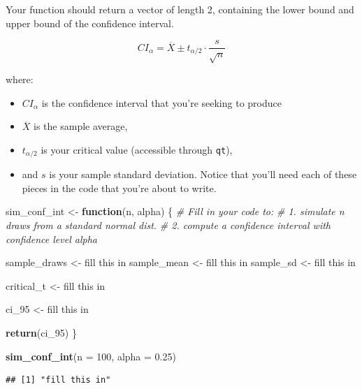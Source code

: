 \documentclass[
]{book}
\newenvironment{Shaded}{\begin{snugshade}}{\end{snugshade}}
\newcommand{\AttributeTok}[1]{\textcolor[rgb]{0.13,0.29,0.53}{#1}}
\newcommand{\CommentTok}[1]{\textcolor[rgb]{0.56,0.35,0.01}{\textit{#1}}}
\newcommand{\ControlFlowTok}[1]{\textcolor[rgb]{0.13,0.29,0.53}{\textbf{#1}}}
\newcommand{\DecValTok}[1]{\textcolor[rgb]{0.00,0.00,0.81}{#1}}
\newcommand{\FloatTok}[1]{\textcolor[rgb]{0.00,0.00,0.81}{#1}}
\newcommand{\FunctionTok}[1]{\textcolor[rgb]{0.13,0.29,0.53}{\textbf{#1}}}
\newcommand{\NormalTok}[1]{#1}
\newcommand{\OtherTok}[1]{\textcolor[rgb]{0.56,0.35,0.01}{#1}}
\newcommand{\StringTok}[1]{\textcolor[rgb]{0.31,0.60,0.02}{#1}}
\providecommand{\tightlist}{%
  \setlength{\itemsep}{0pt}\setlength{\parskip}{0pt}}
\theoremstyle{definition}
\theoremstyle{definition}
\theoremstyle{definition}
\theoremstyle{definition}
\theoremstyle{remark}
\begin{document}
Your function should return a vector of length 2, containing the lower bound and upper bound of the confidence interval.

\[
CI_{\alpha} = \overline{X} \pm t_{\alpha/2} \cdot \frac{s}{\sqrt{n}}
\]

where:

\begin{itemize}
\tightlist
\item
  \(CI_\alpha\) is the confidence interval that you're seeking to produce
\item
  \(\overline{X}\) is the sample average,\\
\item
  \(t_{\alpha/2}\) is your critical value (accessible through \texttt{qt}),
\item
  and \(s\) is your sample standard deviation. Notice that you'll need each of these pieces in the code that you're about to write.
\end{itemize}

\begin{Shaded}
\begin{Highlighting}[]
\NormalTok{sim\_conf\_int }\OtherTok{\textless{}{-}} \ControlFlowTok{function}\NormalTok{(n, alpha) \{}
  \CommentTok{\# Fill in your code to: }
  \CommentTok{\# 1. simulate n draws from a standard normal dist.}
  \CommentTok{\# 2. compute a confidence interval with confidence level alpha}
  
\NormalTok{  sample\_draws }\OtherTok{\textless{}{-}} \StringTok{\textquotesingle{}fill this in\textquotesingle{}}
\NormalTok{  sample\_mean  }\OtherTok{\textless{}{-}} \StringTok{\textquotesingle{}fill this in\textquotesingle{}}
\NormalTok{  sample\_sd    }\OtherTok{\textless{}{-}} \StringTok{\textquotesingle{}fill this in\textquotesingle{}}
  
\NormalTok{  critical\_t }\OtherTok{\textless{}{-}} \StringTok{\textquotesingle{}fill this in\textquotesingle{}}
  
\NormalTok{  ci\_95 }\OtherTok{\textless{}{-}} \StringTok{\textquotesingle{}fill this in\textquotesingle{}}
  
  \FunctionTok{return}\NormalTok{(ci\_95)  }
\NormalTok{\}}

\FunctionTok{sim\_conf\_int}\NormalTok{(}\AttributeTok{n =} \DecValTok{100}\NormalTok{, }\AttributeTok{alpha =} \FloatTok{0.25}\NormalTok{)}
\end{Highlighting}
\end{Shaded}

\begin{verbatim}
## [1] "fill this in"
\end{verbatim}
\end{document}
